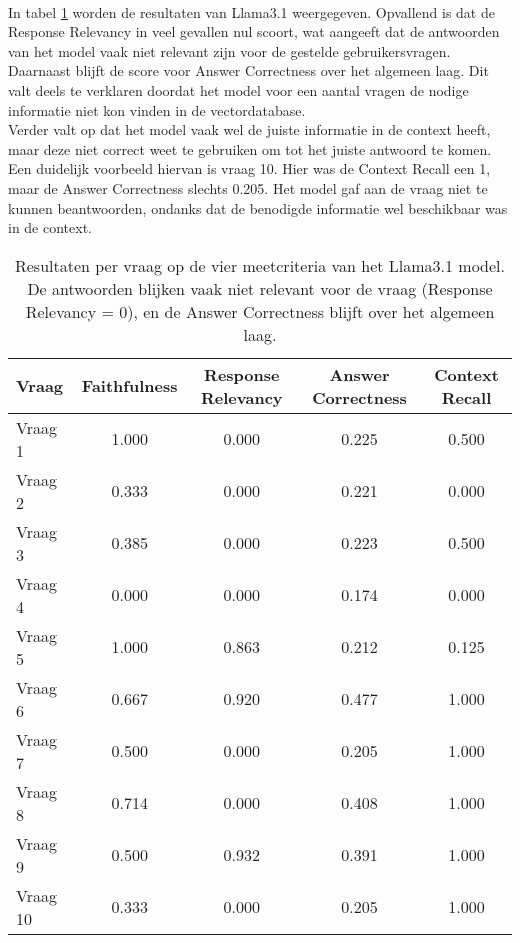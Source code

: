 \\[1em]
In tabel \ref{tab:resultaten_vragen_llama3.1} worden de resultaten van Llama3.1 weergegeven. Opvallend is dat de Response Relevancy in veel gevallen nul scoort, wat aangeeft dat de antwoorden van het model vaak niet relevant zijn voor de gestelde gebruikersvragen. Daarnaast blijft de score voor Answer Correctness over het algemeen laag. Dit valt deels te verklaren doordat het model voor een aantal vragen de nodige informatie niet kon vinden in de vectordatabase.
\\[1em]
Verder valt op dat het model vaak wel de juiste informatie in de context heeft, maar deze niet correct weet te gebruiken om tot het juiste antwoord te komen. Een duidelijk voorbeeld hiervan is vraag 10. Hier was de Context Recall een 1, maar de Answer Correctness slechts 0.205. Het model gaf aan de vraag niet te kunnen beantwoorden, ondanks dat de benodigde informatie wel beschikbaar was in de context.

\begin{table}[H]
    \begin{tabular}{|l|c|c|c|c|}
        \hline
        \textbf{Vraag} & \textbf{Faithfulness} & \textbf{Response Relevancy} & \textbf{Answer Correctness} & \textbf{Context Recall} \\
        \hline
        Vraag 1 & 1.000 & 0.000 & 0.225 & 0.500 \\
        Vraag 2 & 0.333 & 0.000 & 0.221 & 0.000 \\
        Vraag 3 & 0.385 & 0.000 & 0.223 & 0.500 \\
        Vraag 4 & 0.000 & 0.000 & 0.174 & 0.000 \\
        Vraag 5 & 1.000 & 0.863 & 0.212 & 0.125 \\
        Vraag 6 & 0.667 & 0.920 & 0.477 & 1.000 \\
        Vraag 7 & 0.500 & 0.000 & 0.205 & 1.000 \\
        Vraag 8 & 0.714 & 0.000 & 0.408 & 1.000 \\
        Vraag 9 & 0.500 & 0.932 & 0.391 & 1.000 \\
        Vraag 10 & 0.333 & 0.000 & 0.205 & 1.000 \\
        \hline
    \end{tabular}
    \caption{Resultaten per vraag op de vier meetcriteria van het Llama3.1 model. De antwoorden blijken vaak niet relevant voor de vraag (Response Relevancy = 0), en de Answer Correctness blijft over het algemeen laag.}
    \label{tab:resultaten_vragen_llama3.1}
\end{table}

